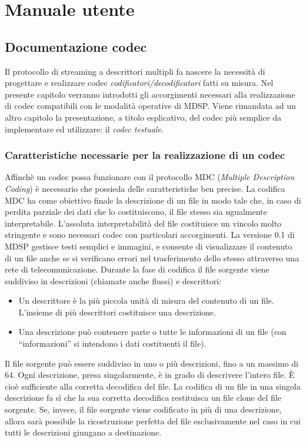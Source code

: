 \chapter{Manuale utente}
\section{Documentazione codec}
Il protocollo di streaming a descrittori multipli fa nascere la necessit\`a di progettare e realizzare codec \emph{codificatori/decodificatori} fatti su misura. Nel presente capitolo verranno introdotti gli accorgimenti necessari alla realizzazione di codec compatibili con le modalit\`a operative di MDSP. Viene rimandata ad un altro capitolo la presentazione, a titolo esplicativo, del codec pi\`u semplice da implementare ed utilizzare: il \emph{codec testuale}.

\subsection{Caratteristiche necessarie per la realizzazione di un codec}
Affinch\`e un codec possa funzionare con il protocollo MDC (\emph{Multiple Description Coding}) è necessario che possieda delle caratteristiche ben precise. La codifica MDC ha come obiettivo finale la descrizione di un file in modo tale che, in caso di perdita parziale dei dati che lo costituiscono, il file stesso sia ugualmente interpretabile. L'assoluta interpretabilit\`a del file costituisce un vincolo molto stringente e sono necessari codec con particolari accorgimenti. La versione 0.1 di MDSP gestisce testi semplici e immagini, e consente di visualizzare il contenuto di un file anche se si verificano errori nel trasferimento dello stesso attraverso una rete di telecomunicazione. Durante la fase di codifica il file sorgente viene suddiviso in descrizioni (chiamate anche flussi) e descrittori:
\begin{itemize}
 \item Un descrittore \`e la pi\`u piccola unit\`a di misura del contenuto di un file. L'insieme di pi\`u descrittori costituisce una descrizione.
 \item Una descrizione pu\`o contenere parte o tutte le informazioni di un file (con ``informazioni'' si intendono i dati costituenti il file).
\end{itemize}
Il file sorgente pu\`o essere suddiviso in uno o pi\`u descrizioni, fino a un massimo di 64. Ogni descrizione, presa singolarmente, \`e in grado di descrivere l'intero file. \`E cio\`e sufficiente alla corretta decodifica del file. La codifica di un file in una singola descrizione fa s\`i che la sua corretta decodifica restituisca un file clone del file sorgente. Se, invece, il file sorgente viene codificato in pi\`u di una descrizione, allora sarà possibile la ricostruzione perfetta del file esclusivamente nel caso in cui tutti le descrizioni giungano a destinazione.

